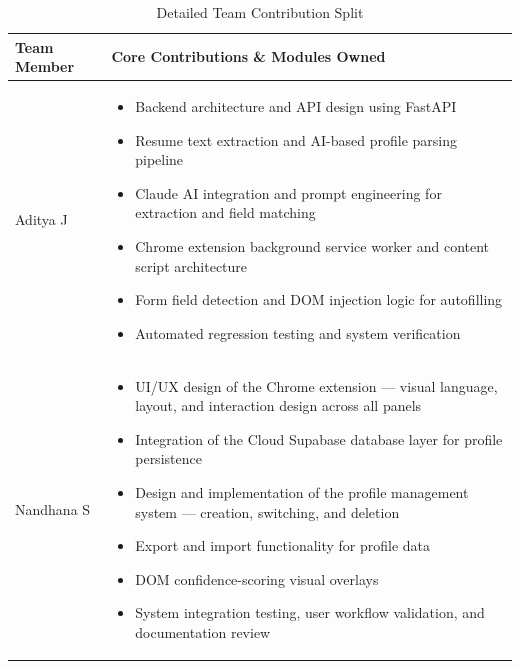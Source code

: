 \documentclass[12pt,a4paper]{report}
\begin{document}
\begin{table}[h]
\centering
\caption{Detailed Team Contribution Split}
\label{tab:team_contribution}
\begin{tabular}{@{}p{3cm}p{11.1cm}@{}}
\toprule
\textbf{Team Member} & \textbf{Core Contributions \& Modules Owned} \\ \midrule
Aditya J &
\begin{minipage}[t]{10.9cm}
\vspace{2pt}
\begin{itemize}[leftmargin=1em, noitemsep, topsep=0pt, partopsep=0pt]
    \item Backend architecture and API design using FastAPI
    \item Resume text extraction and AI-based profile parsing pipeline
    \item Claude AI integration and prompt engineering for extraction and field matching
    \item Chrome extension background service worker and content script architecture
    \item Form field detection and DOM injection logic for autofilling
    \item Automated regression testing and system verification
\end{itemize}
\vspace{2pt}
\end{minipage} \\ \midrule
Nandhana S &
\begin{minipage}[t]{10.9cm}
\vspace{2pt}
\begin{itemize}[leftmargin=1em, noitemsep, topsep=0pt, partopsep=0pt]
    \item UI/UX design of the Chrome extension — visual language, layout, and interaction design across all panels
    \item Integration of the Cloud Supabase database layer for profile persistence
    \item Design and implementation of the profile management system — creation, switching, and deletion
    \item Export and import functionality for profile data
    \item DOM confidence-scoring visual overlays
    \item System integration testing, user workflow validation, and documentation review
\end{itemize}
\vspace{2pt}
\end{minipage} 
\end{tabular}
\end{table}
\end{document}
